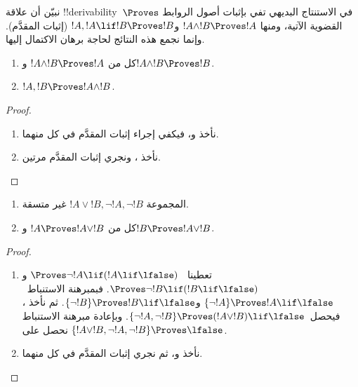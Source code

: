 \documentclass[../../../include/open-logic-section]{subfiles}
\begin{document}
      {}
      {}


\begin{explain}
  نبيّن أن علاقة !!{derivability}~$\Proves$ في الاستنتاج البديهي
  تفي بإثبات أصول الروابط القضوية الآتية، ومنها
  $!A \land !B \Proves !A$ و$!A, !A \lif !B \Proves !B$
  (إثبات المقدَّم). وإنما نجمع هذه النتائج لحاجة برهان الاكتمال إليها.
\end{explain}

\begin{prop}
  \begin{enumerate}
  \item {} كل من $!A \land !B \Proves
    !A$ و$!A \land !B \Proves !B$.
  \item {} $!A, !B \Proves !A \land !B$.
  \end{enumerate}
\end{prop}

\begin{proof}
  \begin{enumerate}
    \item نأخذ  و،
      فيكفي إجراء إثبات المقدَّم في كل منهما.
  \item نأخذ ، ونجري إثبات المقدَّم مرتين.
  \end{enumerate}
\end{proof}


\begin{prop}
  \begin{enumerate}
  \item المجموعة $!A \lor !B, \lnot !A, \lnot !B$ غير متسقة.
  \item كل من $!A \Proves !A \lor !B$ و$!B \Proves !A \lor !B$.
  \end{enumerate}
\end{prop}

\begin{proof}
  \begin{enumerate}
  \item تعطينا ~$\Proves \lnot !A \lif (!A
    \lif \lfalse)$ و$\Proves \lnot !B \lif (!B \lif \lfalse)$.
    فبمبرهنة الاستنباط~$\{\lnot !A\} \Proves !A \lif
    \lfalse$ و$\{\lnot !B\} \Proves !B \lif \lfalse$.
    ثم نأخذ ، فيحصل~$\{\lnot !A, \lnot !B\} \Proves (!A
    \lor !B) \lif \lfalse$. وبإعادة مبرهنة الاستنباط نحصل على
    $\{!A \lor !B, \lnot !A, \lnot !B\} \Proves \lfalse$.
  \item نأخذ  و،
    ثم نجري إثبات المقدَّم في كل منهما.
  \end{enumerate}
\end{proof}
\end{document}
